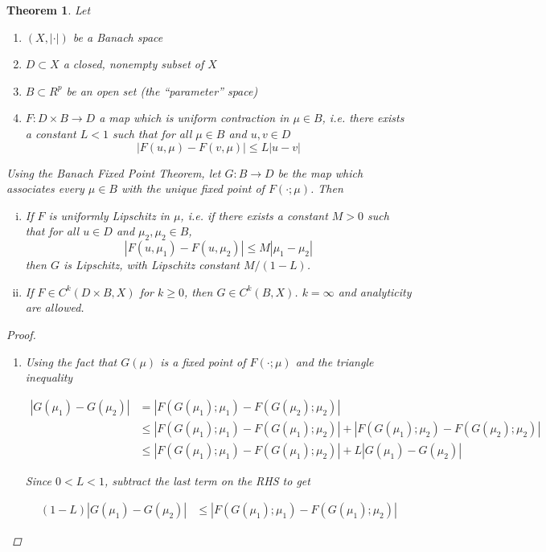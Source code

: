 \documentclass{article}
\newtheorem{theorem}{Theorem}[section]
\begin{document}
\begin{theorem}
Let 
\begin{enumerate}
\item $(X, |\cdot|)$ be a Banach space
\item $D \subset X$ a closed, nonempty subset of $X$
\item $B \subset R^p$ be an open set (the ``parameter'' space)
\item $F: D \times B \rightarrow D$ a map which is uniform contraction in $\mu \in B$, i.e. there exists a constant $L < 1$ such that for all $\mu \in B$ and $u, v \in D$
\begin{equation}
|F(u, \mu) - F(v, \mu)| \leq L|u - v|
\end{equation}
\end{enumerate}

Using the Banach Fixed Point Theorem, let $G: B \rightarrow D$ be the map which associates every $\mu \in B$ with the unique fixed point of $F(\cdot; \mu)$. Then

\begin{enumerate}[(i)]
\item If $F$ is uniformly Lipschitz in $\mu$, i.e. if there exists a constant $M > 0$ such that for all $u \in D$ and $\mu_2, \mu_2 \in B$, 
\[
|F(u, \mu_1) - F(u, \mu_2)| \leq M |\mu_1 - \mu_2|
\]
then $G$ is Lipschitz, with Lipschitz constant $M / (1 - L)$.
\item If $F \in C^k(D \times B, X)$ for $k \geq 0$, then $G \in C^k(B, X)$. $k = \infty$ and analyticity are allowed.
\end{enumerate}
\begin{proof}
\begin{enumerate}
\item Using the fact that $G(\mu)$ is a fixed point of $F(\cdot; \mu)$ and the triangle inequality

\begin{align*}
|G(\mu_1) - G(\mu_2)| &= |F( G(\mu_1); \mu_1) - F(G(\mu_2); \mu_2)| \\
&\leq |F( G(\mu_1); \mu_1) - F(G(\mu_1); \mu_2)| + |F( G(\mu_1); \mu_2) - F(G(\mu_2); \mu_2)| \\
&\leq |F( G(\mu_1); \mu_1) - F(G(\mu_1); \mu_2)| + L |G(\mu_1) - G(\mu_2)|
\end{align*}

Since $0 <L < 1$, subtract the last term on the RHS to get

\begin{align*}
(1 - L)|G(\mu_1) - G(\mu_2)| 
&\leq |F( G(\mu_1); \mu_1) - F(G(\mu_1); \mu_2)|
\end{align*}


\end{enumerate}
\end{proof}
\end{theorem}
\end{document}
